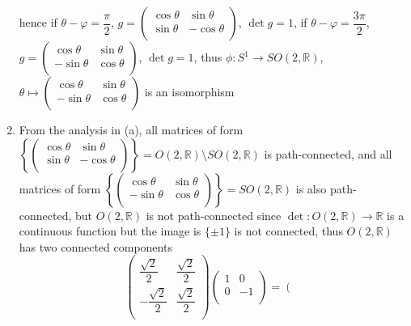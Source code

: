 \documentclass[main]{subfiles}
\begin{document}
\begin{solution}
\begin{enumerate}[label=(\alph*),leftmargin=*]
hence if $\theta-\varphi=\dfrac{\pi}{2}$, $g=\left( {\begin{array}{cc}
   \cos{\theta} & \sin{\theta} \\
   \sin{\theta} & -\cos{\theta} \\
  \end{array} } \right)$, $\det{g}=1$, if $\theta-\varphi=\dfrac{3\pi}{2}$, $g=\left( {\begin{array}{cc}
   \cos{\theta} & \sin{\theta} \\
   -\sin{\theta} & \cos{\theta} \\
  \end{array} } \right)$, $\det{g}=1$, thus $\phi:S^1\rightarrow SO(2,\mathbb{R})$, $\theta\mapsto\left( {\begin{array}{cc}
   \cos{\theta} & \sin{\theta} \\
   -\sin{\theta} & \cos{\theta} \\
  \end{array} } \right)$ is an isomorphism
\item From the analysis in (a), all matrices of form $\left\{\left( {\begin{array}{cc}
   \cos{\theta} & \sin{\theta} \\
   \sin{\theta} & -\cos{\theta} \\
  \end{array} } \right)\right\}=O(2,\mathbb{R})\setminus SO(2,\mathbb{R})$ is path-connected, and all matrices of form $\left\{\left( {\begin{array}{cc}
   \cos{\theta} & \sin{\theta} \\
   -\sin{\theta} & \cos{\theta} \\
  \end{array} } \right)\right\}=SO(2,\mathbb{R})$ is also path-connected, but $O(2,\mathbb{R})$ is not path-connected since $\det:O(2,\mathbb{R})\rightarrow\mathbb{R}$ is a continuous function but the image is $\{\pm1\}$ is not connected, thus $O(2,\mathbb{R})$ has two connected components
\[\left( {\begin{array}{cc}
   \dfrac{\sqrt2}{2} & \dfrac{\sqrt2}{2} \\
   -\dfrac{\sqrt2}{2} & \dfrac{\sqrt2}{2} \\
  \end{array} } \right)\left( {\begin{array}{cc}
   1 & 0 \\
   0 & -1 \\
  \end{array} } \right)=\left( {\begin{array}{cc}

\end{array}}\]
\end{enumerate}
\end{solution}
\end{document}
